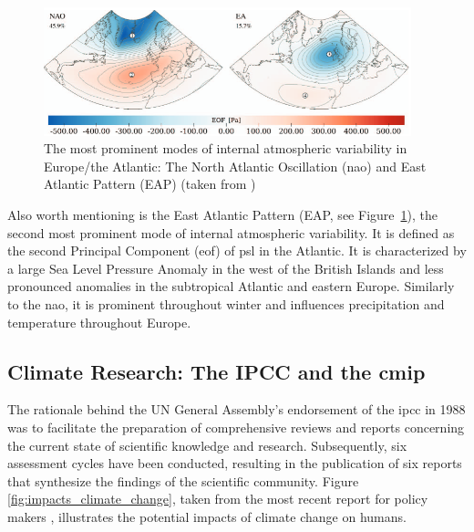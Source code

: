 \begin{figure}
  \begin{center}
    \includegraphics[width=0.95\textwidth]{figures/nao_eap.png}
  \end{center}
  \caption[NAO EAP EOF Spatial Pattern]{The most prominent modes of internal atmospheric variability in Europe/the Atlantic: The North Atlantic Oscillation (\ac{nao}) and East Atlantic Pattern (EAP) (taken from \cite{vietinghoff_extension_2021})}\label{fig:nao eap}
\end{figure}


Also worth mentioning is the East Atlantic Pattern (EAP, see Figure~\ref{fig:nao eap}), the second most prominent mode of internal atmospheric variability.
It is defined as the second Principal Component (\ac{eof}) of \ac{psl} in the Atlantic.  
It is characterized by a large Sea Level Pressure Anomaly in the west of the British Islands and less pronounced anomalies in the subtropical Atlantic and eastern Europe. 
Similarly to the \ac{nao}, it is prominent throughout winter and influences precipitation and temperature throughout Europe. \cite{comas-bru_effect_2016, song_east_2019}

\subsection{Climate Research: The IPCC and the \ac{cmip}}
\label{sec:climate research}


The rationale behind the UN General Assembly's endorsement of the \ac{ipcc} in 1988 was to facilitate the preparation of comprehensive reviews and reports concerning the current state of scientific knowledge and research. 
Subsequently, six assessment cycles have been conducted, resulting in the publication of six reports that synthesize the findings of the scientific community. 
Figure \ref{fig:impacts_climate_change}, taken from the most recent report for policy makers \cite{lee2024climate}, illustrates the potential impacts of climate change on humans.

